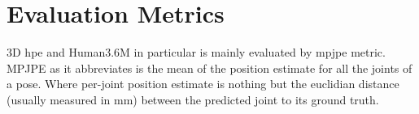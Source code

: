 \section{Evaluation Metrics} %
3D \ac{hpe} and Human3.6M in particular is mainly evaluated by \ac{mpjpe} metric. MPJPE as it abbreviates is the mean of the position estimate for all the joints of a pose. Where per-joint position estimate is nothing but the euclidian distance (usually measured in mm) between the predicted joint to its ground truth.
